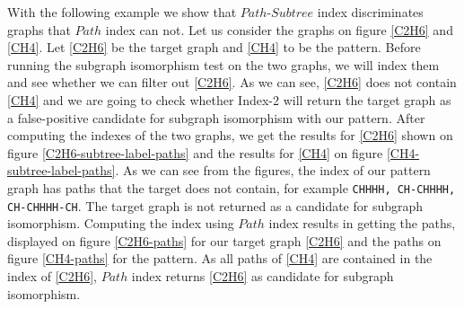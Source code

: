 \documentclass{l4proj}
\theoremstyle{definition}
\begin{document}
With the following example we show that $Path$-$Subtree$ index discriminates graphs that $Path$ index can not. Let us consider the graphs on figure \ref{C2H6} and \ref{CH4}. Let \ref{C2H6} be the target graph and \ref{CH4} to be the pattern. Before running the subgraph isomorphism test on the two graphs, we will index them and see whether we can filter out \ref{C2H6}. As we can see, \ref{C2H6} does not contain \ref{CH4} and we are going to check whether Index-2 will return the target graph as a false-positive candidate for subgraph isomorphism with our pattern. After computing the indexes of the two graphs, we get the results for \ref{C2H6} shown on figure \ref{C2H6-subtree-label-paths} and the results for \ref{CH4} on figure \ref{CH4-subtree-label-paths}. As we can see from the figures, the index of our pattern graph has paths that the target does not contain, for example \texttt{CHHHH, CH-CHHHH, CH-CHHHH-CH}. The target graph is not returned as a candidate for subgraph isomorphism. Computing the index using $Path$ index results in getting the paths, displayed on figure \ref{C2H6-paths} for our target graph \ref{C2H6} and the paths on figure \ref{CH4-paths} for the pattern. As all paths of \ref{CH4} are contained in the index of \ref{C2H6}, $Path$ index returns \ref{C2H6} as candidate for subgraph isomorphism.\par
\end{document}

